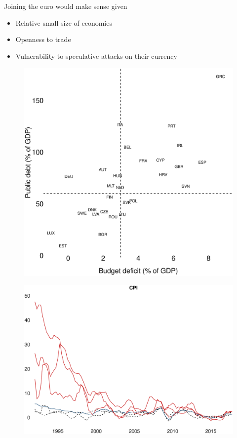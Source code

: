 \documentclass{beamer}
\begin{document}
\begin{frame}
 Joining the euro would make sense given   
\begin{itemize}
  \item Relative small size of economies
  \item Openness to trade
  \item Vulnerability to speculative attacks on their currency
\end{itemize}
\end{frame}

\begin{frame}
  \begin{figure}
    \includegraphics[scale=.3]{fiscal_compliance.eps}
  \end{figure}
\end{frame}

\begin{frame}
  \begin{figure}
    \includegraphics[scale=.3]{inflation_non_eurozone.eps}
  \end{figure}
\end{frame}


\end{document}
